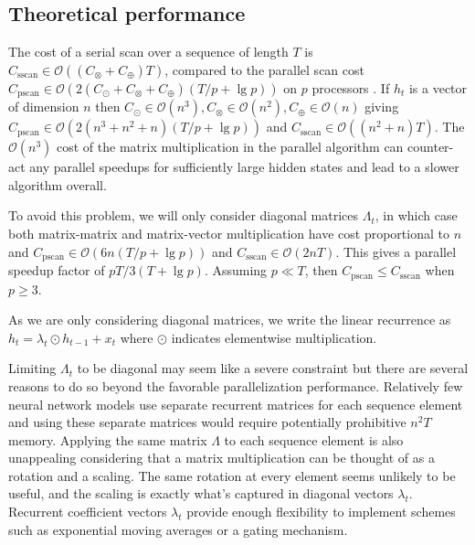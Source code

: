 \documentclass{article}
\begin{document}
\subsection{Theoretical performance}
The cost of a serial scan over a sequence of length $T$ is
$C_\text{sscan} \in \mathcal{O}((C_\otimes + C_\oplus)T)$, compared to the parallel scan cost
$C_\text{pscan} \in \mathcal{O}(2(C_\odot + C_\otimes + C_\oplus)(T/p + \lg p))$ on $p$ processors \citep{blelloch1990prefix}.
If $h_t$ is a vector of dimension $n$ then
$C_\odot \in  \mathcal{O}(n^3), C_\otimes \in \mathcal{O}(n^2), C_\oplus \in \mathcal{O}(n)$ giving
$C_\text{pscan} \in \mathcal{O}(2(n^3 + n^2 + n)(T/p + \lg p))$ and
$C_\text{sscan} \in \mathcal{O}((n^2 + n)T)$. The $\mathcal{O}(n^3)$ cost of the matrix
multiplication in the parallel algorithm can counter-act any parallel speedups for
sufficiently large hidden states and lead to a slower algorithm overall.

To avoid this problem, we will only consider diagonal matrices $\Lambda_t$, in
which case both matrix-matrix and matrix-vector multiplication have cost
proportional to $n$ and $C_\text{pscan}\in \mathcal{O}(6n(T/p + \lg p))$ and
$C_\text{sscan} \in \mathcal{O}(2nT)$. This gives a parallel speedup factor of
$pT/3(T+\lg p)$. Assuming $p \ll T$, then $C_\text{pscan} \le
C_\text{sscan}$ when $p \ge 3$.

As we are only considering diagonal matrices,
we write the linear recurrence as $h_t = \lambda_t \odot h_{t-1} + x_t$
where $\odot$ indicates elementwise multiplication.

Limiting $\Lambda_t$ to be diagonal may seem like a severe constraint but there are
several reasons to do so beyond the favorable parallelization performance. Relatively few neural
network models use separate recurrent matrices for each sequence element and using these
separate matrices would require potentially prohibitive $n^2T$ memory.
Applying
the same matrix $\Lambda$ to each sequence element is also unappealing considering that a matrix
multiplication can be thought of as a rotation and a scaling. The same rotation at every
element seems unlikely to be useful, and the scaling is exactly what's captured in diagonal
vectors $\lambda_t$. Recurrent coefficient vectors $\lambda_t$ provide enough flexibility
to implement schemes such as exponential moving averages or a gating mechanism.
\end{document}
